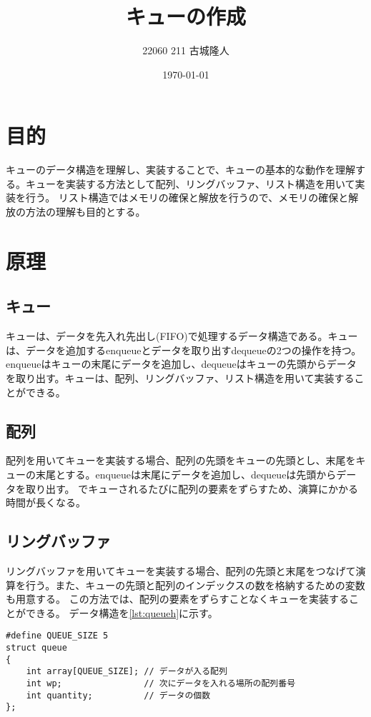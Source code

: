 \documentclass[dvipdfmx]{jsarticle}
\begin{document}
\title{キューの作成} 
\author{22060 211 古城隆人}
\date{\today}
\maketitle


\newpage


\section{目的}
キューのデータ構造を理解し、実装することで、キューの基本的な動作を理解する。キューを実装する方法として配列、リングバッファ、リスト構造を用いて実装を行う。
リスト構造ではメモリの確保と解放を行うので、メモリの確保と解放の方法の理解も目的とする。
\section{原理}
\subsection{キュー}
キューは、データを先入れ先出し(FIFO)で処理するデータ構造である。キューは、データを追加するenqueueとデータを取り出すdequeueの2つの操作を持つ。
enqueueはキューの末尾にデータを追加し、dequeueはキューの先頭からデータを取り出す。キューは、配列、リングバッファ、リスト構造を用いて実装することができる。
\subsection{配列}
配列を用いてキューを実装する場合、配列の先頭をキューの先頭とし、末尾をキューの末尾とする。enqueueは末尾にデータを追加し、dequeueは先頭からデータを取り出す。
でキューされるたびに配列の要素をずらすため、演算にかかる時間が長くなる。
\subsection{リングバッファ}
リングバッファを用いてキューを実装する場合、配列の先頭と末尾をつなげて演算を行う。また、キューの先頭と配列のインデックスの数を格納するための変数も用意する。
この方法では、配列の要素をずらすことなくキューを実装することができる。
データ構造を\ref{lst:queueh}に示す。
\begin{lstlisting}[caption={queue.h}, label={lst:queueh}]
#define QUEUE_SIZE 5
struct queue
{
    int array[QUEUE_SIZE]; // データが入る配列
    int wp;                // 次にデータを入れる場所の配列番号
    int quantity;          // データの個数
};
\end{lstlisting}
\end{document}

